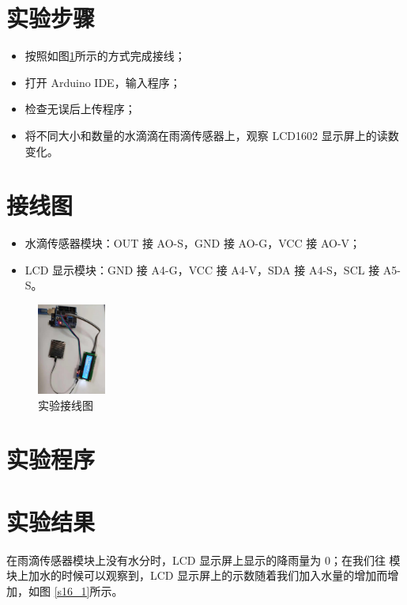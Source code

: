 \documentclass[UTF8, oneside]{ctexbook}
\begin{document}
\section{实验步骤}
\begin{itemize}
    \item[(1)] 按照如图\ref{s16_line}所示的方式完成接线；
    \item[(2)] 打开 Arduino IDE，输入程序；
    \item[(3)] 检查无误后上传程序；
    \item[(4)] 将不同大小和数量的水滴滴在雨滴传感器上，观察 LCD1602 显示屏上的读数变化。
\end{itemize}

\section{接线图}
\begin{itemize}
    \item 水滴传感器模块：OUT 接 AO-S，GND 接 AO-G，VCC 接 AO-V；
    \item LCD 显示模块：GND 接 A4-G，VCC 接 A4-V，SDA 接 A4-S，SCL 接 A5-S。
\end{itemize}
\begin{figure}[h]
    \centering
    \includegraphics[width=0.2\textwidth]{./result/sensor/16/lines2.png}
    \caption{实验接线图}
    \label{s16_line}
\end{figure}

\section{实验程序}


\section{实验结果}
\paragraph{}
在雨滴传感器模块上没有水分时，LCD 显示屏上显示的降雨量为 0；在我们往
模块上加水的时候可以观察到，LCD 显示屏上的示数随着我们加入水量的增加而增加，如图
\ref{s16_1}所示。
\newpage
\end{document}

